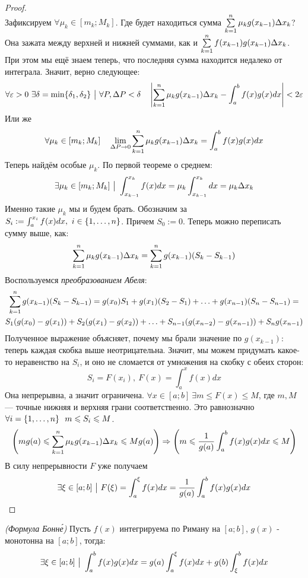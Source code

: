 \begin{proof}
\[	\]
	Зафиксируем $\forall \mu_k \in [m_k; M_k]$. Где будет находиться сумма $\sum\limits_{k = 1}^n \mu_k g(x_{k - 1})\Delta x_k$? Она зажата между верхней и нижней суммами, как и $\sum\limits_{k = 1}^n f(x_{k - 1})g(x_{k - 1})\Delta x_k$. При этом мы ещё знаем теперь, что последняя сумма находится недалеко от интеграла. Значит, верно следующее:
	\[
		\forall \varepsilon > 0\ \exists \delta = \min \{\delta_1, \delta_2\} \ \big|\  \forall P, \Delta P < \delta \quad \left|\sum\limits_{k = 1}^n\mu_kg(x_{k - 1}) \Delta x_k - \int_a^bf(x)g(x)dx\right| < 2\varepsilon
	\]
	Или же
	\[
		\forall \mu_k \in [m_k; M_k] \quad \lim\limits_{\Delta P \to 0} \sum\limits_{k = 1}^n\mu_kg(x_{k - 1})\Delta x_k = \int_a^bf(x)g(x)dx
	\]
	Теперь найдём особые $\mu_k$. По первой теореме о среднем:
	\[
		\exists \mu_k \in [m_k; M_k] \ \big|\  \int_{x_{k - 1}}^{x_k} f(x)dx = \mu_k \int_{x_{k - 1}}^{x_k} dx = \mu_k\Delta x_k
	\]
	Именно такие $\mu_k$ мы и будем брать. Обозначим за $S_i := \int_a^{x_i}f(x)dx,\ i \in \{1, \ldots, n\}$. Причем $S_0 := 0$. Теперь можно переписать сумму выше, как:
	\[
		\sum\limits_{k = 1}^n\mu_kg(x_{k - 1})\Delta x_k = \sum\limits_{k = 1}^ng(x_{k - 1})(S_k - S_{k - 1})
	\]
	Воспользуемся \textit{преобразованием Абеля}:
	\begin{multline*}
		\sum\limits_{k = 1}^ng(x_{k - 1})(S_k - S_{k - 1}) = g(x_0)S_1 +g(x_1)(S_2 - S_1) + \ldots + g(x_{n - 1})(S_n - S_{n - 1}) =
		\\
		 S_1(g(x_0) - g(x_1)) + S_2(g(x_1) - g(x_2)) + \ldots + S_{n - 1}(g(x_{n - 2}) - g(x_{n - 1})) + S_ng(x_{n - 1})
	\end{multline*}
	Полученное выражение объясняет, почему мы брали значение по $g(x_{k - 1})$: теперь каждая скобка выше неотрицательна. Значит, мы можем придумать какое-то неравенство на $S_i$, и оно не сломается от умножения на скобку с обеих сторон:
	\[
		S_i = F(x_i),\ F(x) = \int_a^xf(x)dx
	\]
	Она непрерывна, а значит ограничена. $\forall x \in [a;b]\ \exists m \leq F(x) \leq M$, где $m, M$ --- точные нижняя и верхняя грани соответственно. Это равнозначно $\forall i = \{1, \ldots, n\}\ \ m \leqslant S_i \leqslant M$.
	\[
		\left(mg(a) \leqslant \sum\limits_{k = 1}^n \mu_k g(x_{k - 1})\Delta x_k \leqslant Mg(a)\right) \Rightarrow \left(m \leqslant \frac{1}{g(a)} \int_a^b f(x)g(x)dx \leqslant M\right)
	\]
	В силу непрерывности $F$ уже получаем
	\[
		\exists \xi \in [a;b] \ \big|\  F(\xi) = \int_a^\xi f(x)dx =  \frac{1}{g(a)}\int_a^bf(x)g(x)dx
	\]
\end{proof}


\begin{corollary} \textit{(Формула Бонн\'{е})}
	Пусть $f(x)$  интегрируема по Риману на $[a;b]$, $g(x)$ - монотонна на $[a;b]$, тогда:
	\[
		\exists \xi \in [a;b] \ \big|\  \int_a^b f(x)g(x)dx = g(a)\int_a^\xi f(x)dx + g(b)\int_\xi^b f(x)dx
	\]
\end{corollary}

